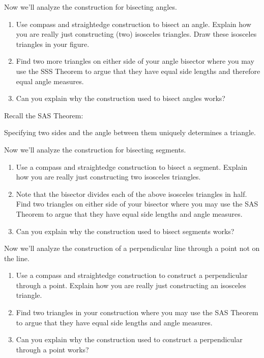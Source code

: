 \documentclass[nooutcomes]{ximera}
\begin{document}
\begin{problem} Now we'll analyze the construction for bisecting angles.
\begin{enumerate}
\item Use compass and straightedge construction to bisect an
  angle. Explain how you are really just constructing (two)
  isosceles triangles. Draw these isosceles triangles in your figure.
\item Find two more triangles on either side of your angle bisector where
  you may use the SSS Theorem to argue that they have equal side
  lengths and therefore equal angle measures.
\item Can you explain why the construction used to bisect angles
  works?
\end{enumerate}
\end{problem}


Recall the SAS Theorem:

\begin{theorem}[SAS] 
Specifying two sides and the angle between them uniquely determines a
triangle.
\end{theorem}


\begin{problem} Now we'll analyze the construction for bisecting segments.
\begin{enumerate} 
\item Use a compass and straightedge construction to bisect a
  segment. Explain how you are really just constructing two
  isosceles triangles.
\item Note that the bisector divides each of the above isosceles
  triangles in half. Find two triangles on either side of your
  bisector where you may use the SAS Theorem to argue that they have
  equal side lengths and angle measures.
\item Can you explain why the construction used to bisect segments
  works?
\end{enumerate}
\end{problem}




\begin{problem} 
Now we'll analyze the construction of a perpendicular line through a
point not on the line.
\begin{enumerate}
\item Use a compass and straightedge construction to construct a
  perpendicular through a point. Explain how you are really just
  constructing an isosceles triangle.
\item Find two triangles in your construction where you may use the
  SAS Theorem to argue that they have equal side lengths and angle
  measures.
\item Can you explain why the construction used to construct a
  perpendicular through a point works?
\end{enumerate}
\end{problem}
\end{document}
